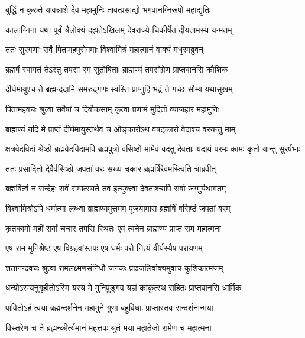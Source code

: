 \twolineshloka
{बुद्धिं न कुरुते यावन्नाशे देव महामुनिः}
{तावत्प्रसाद्यो भगवानग्निरूपो महाद्युतिः} %

\twolineshloka
{कालाग्निना यथा पूर्वं त्रैलोक्यं दह्यतेऽखिलम्}
{देवराज्ये चिकीर्षेत दीयतामस्य यन्मतम्} %

\twolineshloka
{ततः सुरगणाः सर्वे पितामहपुरोगमाः}
{विश्वामित्रं महात्मानं वाक्यं मधुरमब्रुवन्} %

\twolineshloka
{ब्रह्मर्षे स्वागतं तेऽस्तु तपसा स्म सुतोषिताः}
{ब्राह्मण्यं तपसोग्रेण प्राप्तवानसि कौशिक} %

\twolineshloka
{दीर्घमायुश्च ते ब्रह्मन्ददामि समरुद्गणः}
{स्वस्ति प्राप्नुहि भद्रं ते गच्छ सौम्य यथासुखम्} %

\twolineshloka
{पितामहवचः श्रुत्वा सर्वेषां च दिवौकसाम्}
{कृत्वा प्रणामं मुदितो व्याजहार महामुनिः} %

\twolineshloka
{ब्राह्मण्यं यदि मे प्राप्तं दीर्घमायुस्तथैव च}
{ओङ्कारोऽथ वषट्कारो वेदाश्च वरयन्तु माम्} %

\threelineshloka
{क्षत्रवेदविदां श्रेष्ठो ब्रह्मवेदविदामपि}
{ब्रह्मपुत्रो वसिष्ठो मामेवं वदतु देवताः}
{यद्ययं परमः कामः कृतो यान्तु सुरर्षभाः} %

\twolineshloka
{ततः प्रसादितो देवैर्वसिष्ठो जपतां वरः}
{सख्यं चकार ब्रह्मर्षिरेवमस्त्विति चाब्रवीत्} %

\twolineshloka
{ब्रह्मर्षित्वं न सन्देहः सर्वं सम्पत्स्यते तव}
{इत्युक्त्वा देवताश्चापि सर्वा जग्मुर्यथागतम्} %

\twolineshloka
{विश्वामित्रोऽपि धर्मात्मा लब्ध्वा ब्राह्मण्यमुत्तमम्}
{पूजयामास ब्रह्मर्षिं वसिष्ठं जपतां वरम्} %

\twolineshloka
{कृतकामो महीं सर्वां चचार तपसि स्थितः}
{एवं त्वनेन ब्राह्मण्यं प्राप्तं राम महात्मना} %

\twolineshloka
{एष राम मुनिश्रेष्ठ एष विग्रहवांस्तपः}
{एष धर्मः परो नित्यं वीर्यस्यैष परायणम्} %

\twolineshloka
{शतानन्दवचः श्रुत्वा रामलक्ष्मणसंनिधौ}
{जनकः प्राञ्जलिर्वाक्यमुवाच कुशिकात्मजम्} %

\twolineshloka
{धन्योऽस्म्यनुगृहीतोऽस्मि यस्य मे मुनिपुङ्गव}
{यज्ञं काकुत्स्थ सहितः प्राप्तवानसि धार्मिक} %

\twolineshloka
{पावितोऽहं त्वया ब्रह्मन्दर्शनेन महामुने}
{गुणा बहुविधाः प्राप्तास्तव सन्दर्शनान्मया} %

\twolineshloka
{विस्तरेण च ते ब्रह्मन्कीर्त्यमानं महत्तपः}
{श्रुतं मया महातेजो रामेण च महात्मना} %


